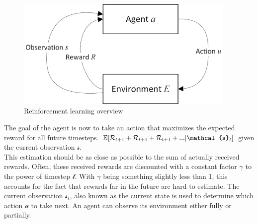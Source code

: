 \begin{figure}
	\centering
	\includegraphics[width=300pt]{images/rl_overview.png}
	\caption{Reinforcement learning overview}
\end{figure}
The goal of the agent is now to take an action that maximizes the expected reward for all future timesteps. $\EX[\mathcal{R}_{t+1}+\mathcal{R}_{t+1}+\mathcal{R}_{t+1}+...|\mathcal{s}_{t}]$ given the current observation $\mathcal{s}$.\\
This estimation should be as close as possible to the sum of actually received rewards. Often, these received rewards are discounted with a constant factor $\mathcal{\gamma}$ to the power of timestep $\mathcal{t}$. With $\mathcal{\gamma}$ being something slightly less than 1, this accounts for the fact that rewards far in the future are hard to estimate.
The current observation $\mathcal{s}_{t}$, also known as the current state is used to determine which action $\mathcal{u}$ to take next. An agent can observe its environment either fully or partially.
